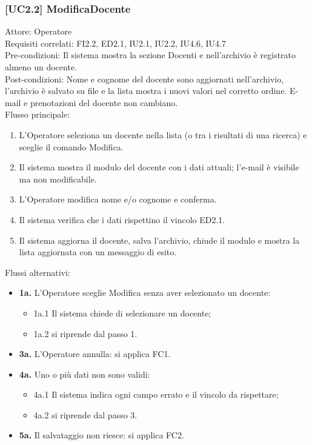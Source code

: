 \subsubsection{[UC2.2] ModificaDocente}
\noindent Attore: Operatore\\
Requisiti correlati: FI2.2, ED2.1, IU2.1, IU2.2, IU4.6, IU4.7\\
Pre-condizioni: Il sistema mostra la sezione Docenti e nell'archivio è registrato almeno un docente.\\
Post-condizioni: Nome e cognome del docente sono aggiornati nell'archivio, l'archivio è salvato su file e la lista mostra i nuovi valori nel corretto ordine. E-mail e prenotazioni del docente non cambiano.\\

\noindent Flusso principale:
\begin{enumerate}
\item L'Operatore seleziona un docente nella lista (o tra i risultati di una ricerca) e sceglie il comando Modifica.
\item Il sistema mostra il modulo del docente con i dati attuali; l'e-mail è visibile ma non modificabile.
\item L'Operatore modifica nome e/o cognome e conferma.
\item Il sistema verifica che i dati rispettino il vincolo ED2.1.
\item Il sistema aggiorna il docente, salva l'archivio, chiude il modulo e mostra la lista aggiornata con un messaggio di esito.
\end{enumerate}
\noindent Flussi alternativi:
\begin{itemize}
\item \textbf{1a.} L'Operatore sceglie Modifica senza aver selezionato un docente:
\begin{itemize}
\item 1a.1 Il sistema chiede di selezionare un docente;
\item 1a.2 si riprende dal passo 1.
\end{itemize}
\item \textbf{3a.} L'Operatore annulla: si applica FC1.
\item \textbf{4a.} Uno o più dati non sono validi:
\begin{itemize}
\item 4a.1 Il sistema indica ogni campo errato e il vincolo da rispettare;
\item 4a.2 si riprende dal passo 3.
\end{itemize}
\item \textbf{5a.} Il salvataggio non riesce: si applica FC2.
\end{itemize}

